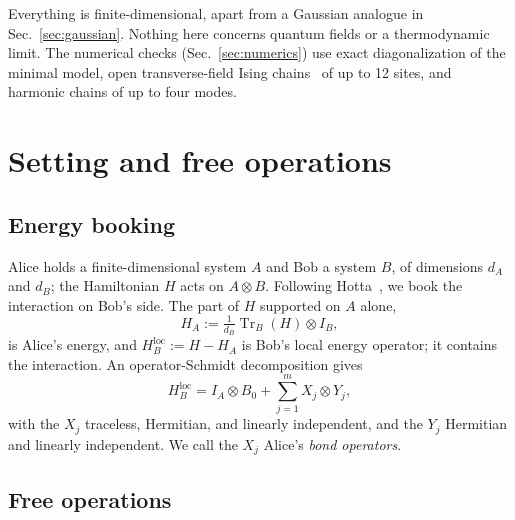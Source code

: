 \documentclass[aps,pra,twocolumn,reprint,superscriptaddress,nofootinbib,floatfix]{revtex4-2}
\theoremstyle{plain}
\theoremstyle{remark}
\newcommand{\Tr}{\operatorname{Tr}}
\newcommand{\HBl}{H_B^{\mathrm{loc}}}
\begin{document}
Everything is finite-dimensional, apart from a Gaussian analogue in
Sec.~\ref{sec:gaussian}. Nothing here concerns quantum fields or a thermodynamic limit.
The numerical checks (Sec.~\ref{sec:numerics}) use exact diagonalization of the minimal
model, open transverse-field Ising chains~\cite{Pfeuty1970} of up to 12 sites, and harmonic
chains of up to four modes.

\section{Setting and free operations}
\label{sec:setting}

\subsection{Energy booking}

Alice holds a finite-dimensional system $A$ and Bob a system $B$, of dimensions $d_A$ and
$d_B$; the Hamiltonian $H$ acts on $A\otimes B$. Following Hotta~\cite[Sec.~3]{Hotta2011review},
we book the interaction on Bob's side. The part of $H$ supported on $A$ alone,
\begin{equation}
H_A := \tfrac{1}{d_B}\Tr_B(H)\otimes I_B ,
\label{eq:HA}
\end{equation}
is Alice's energy, and $\HBl:=H-H_A$ is Bob's local energy operator; it contains the
interaction. An operator-Schmidt decomposition gives
\begin{equation}
\HBl = I_A\otimes B_0 + \sum_{j=1}^{m} X_j\otimes Y_j ,
\label{eq:schmidt}
\end{equation}
with the $X_j$ traceless, Hermitian, and linearly independent, and the $Y_j$ Hermitian and
linearly independent. We call the $X_j$ Alice's \emph{bond operators}.

\subsection{Free operations}
\end{document}
